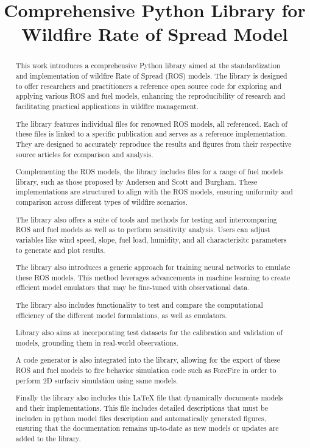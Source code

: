 \documentclass{article}
\title{Comprehensive Python Library for Wildfire Rate of Spread Model}
\author{}
\date{}
\begin{document}
\maketitle
\tableofcontents
\newpage

\begin{abstract}
This work introduces a comprehensive Python library aimed at the standardization and implementation of wildfire Rate of Spread (ROS) models. The library is designed to offer researchers and practitioners a reference open source code for exploring and applying various ROS and fuel models, enhancing the reproducibility of research and facilitating practical applications in wildfire management.

The library features individual files for renowned ROS models, all referenced. Each of these files is linked to a specific publication and serves as a reference implementation. They are designed to accurately reproduce the results and figures from their respective source articles for comparison and analysis.

Complementing the ROS models, the library includes files for a range of fuel models library, such as those proposed by Andersen and Scott and Burgham. These implementations are structured to align with the ROS models, ensuring uniformity and comparison across different types of wildfire scenarios.

The library also offers a suite of tools and methods for testing and intercomparing ROS and fuel models as well as to perform sensitivity analysis. Users can adjust variables like wind speed, slope, fuel load, humidity, and all characterisitc parameters to generate and plot results.

The library also introduces a generic approach for training neural networks to emulate these ROS models. This method leverages advancements in machine learning to create efficient model emulators that may be fine-tuned with observational data.

The library also includes functionality to test and compare the computational efficiency of the different model formulations, as well as emulators.

Library also aims at incorporating test datasets for the calibration and validation of models, grounding them in real-world observations.

A code generator is also integrated into the library, allowing for the export of these ROS and fuel models to fire behavior simulation code such as ForeFire in order to perform 2D surfaciv simulation using same models. 

Finally the library also includes this LaTeX file that dynamically documents models and their implementations. This file includes detailed descriptions that must be includen in python model files description and automatically generated figures, ensuring that the documentation remains up-to-date as new models or updates are added to the library.

\end{abstract}
\end{document}
